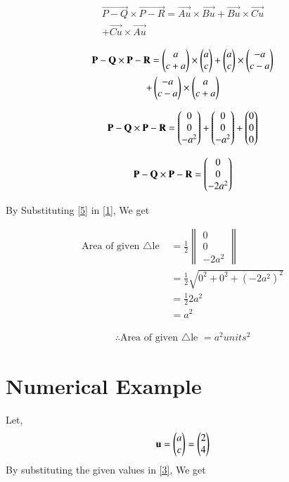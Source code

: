 \documentclass[journal,12pt,twocolumn]{IEEEtran}
\renewcommand\thesection{\arabic{section}}
\begin{document}
\begin{enumerate}[label=\thesection.\arabic*.,ref=\thesection.\theenumi]
\begin{multline}
\Vec{P-Q}\times\Vec{P-R}=\vec{Au}\times\vec{Bu}+\vec{Bu}\times\vec{Cu}\\+\vec{Cu}\times\vec{Au}
\end{multline}

\begin{multline}
\Vec{P-Q}\times \Vec{P-R}=\myvec{a\\c+a}\times\myvec{a\\c}+\myvec{a\\c}\times\myvec{-a\\c-a}\\+\myvec{-a\\c-a}\times\myvec{a\\c+a}
\end{multline}

\begin{multline}
\Vec{P-Q}\times  \Vec{P-R}=\myvec{0\\0\\-a^2}+\myvec{0\\0\\-a^2}+\myvec{0\\0\\0}
\end{multline}

\begin{align}
\Vec{P-Q}\times  \Vec{P-R}=\myvec{0\\0\\-2a^2}
\label{5}
\end{align}

By Substituting \eqref{5} in \eqref{1}, We get

\begin{align}
\text{Area of given $\triangle$le }&=\frac{1}{2}\begin{Vmatrix}
0\\0\\-2a^2
\end{Vmatrix}\\
&= \frac{1}{2}\sqrt{0^2 + 0^2+ (-2a^2)^2}\\
&= \frac{1}{2} 2a^2\\
&=a^2
\end{align}

\begin{align}
\boxed{\therefore \text{Area of given $\triangle$le }=a^2 units^2}
\label{4}
\end{align}

\section{Numerical Example}
Let,
\begin{align}
\mathbf{u}=\begin{pmatrix}a\\c\end{pmatrix}=\begin{pmatrix}2\\4\end{pmatrix}
\end{align}
\solution
By substituting the given values in \eqref{3}, We get


\end{enumerate}
\end{document}
